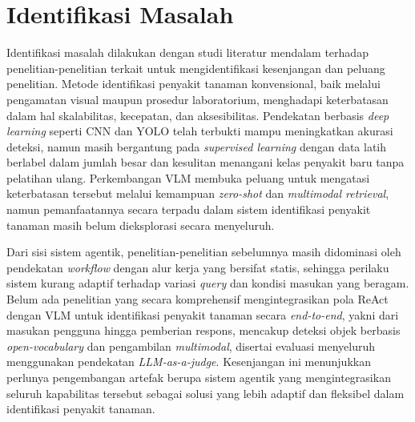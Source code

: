 \section{Identifikasi Masalah}
Identifikasi masalah dilakukan dengan studi literatur mendalam terhadap penelitian-penelitian terkait untuk mengidentifikasi kesenjangan dan peluang penelitian. Metode identifikasi penyakit tanaman konvensional, baik melalui pengamatan visual maupun prosedur laboratorium, menghadapi keterbatasan dalam hal skalabilitas, kecepatan, dan aksesibilitas. Pendekatan berbasis \textit{deep learning} seperti CNN dan YOLO telah terbukti mampu meningkatkan akurasi deteksi, namun masih bergantung pada \textit{supervised learning} dengan data latih berlabel dalam jumlah besar dan kesulitan menangani kelas penyakit baru tanpa pelatihan ulang. Perkembangan VLM membuka peluang untuk mengatasi keterbatasan tersebut melalui kemampuan \textit{zero-shot} dan \textit{multimodal retrieval}, namun pemanfaatannya secara terpadu dalam sistem identifikasi penyakit tanaman masih belum dieksplorasi secara menyeluruh.

Dari sisi sistem agentik, penelitian-penelitian sebelumnya masih didominasi oleh pendekatan \textit{workflow} dengan alur kerja yang bersifat statis, sehingga perilaku sistem kurang adaptif terhadap variasi \textit{query} dan kondisi masukan yang beragam. Belum ada penelitian yang secara komprehensif mengintegrasikan pola ReAct dengan VLM untuk identifikasi penyakit tanaman secara \textit{end-to-end}, yakni dari masukan pengguna hingga pemberian respons, mencakup deteksi objek berbasis \textit{open-vocabulary} dan pengambilan \textit{multimodal}, disertai evaluasi menyeluruh menggunakan pendekatan \textit{LLM-as-a-judge}. Kesenjangan ini menunjukkan perlunya pengembangan artefak berupa sistem agentik yang mengintegrasikan seluruh kapabilitas tersebut sebagai solusi yang lebih adaptif dan fleksibel dalam identifikasi penyakit tanaman.


